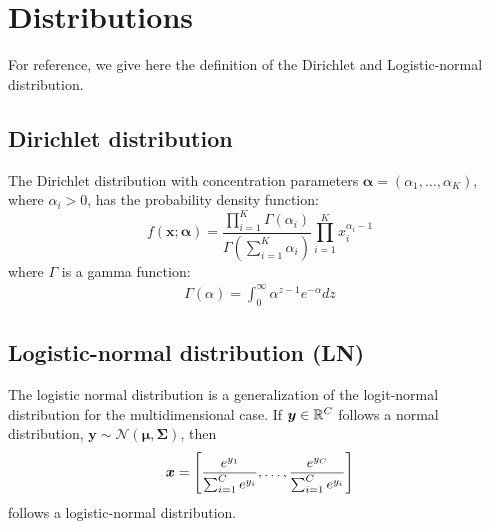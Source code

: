 \section{Distributions}\label{distributions}

For reference, we give here the definition of the Dirichlet and Logistic-normal distribution.

\subsection{Dirichlet distribution}

The Dirichlet distribution with concentration parameters $\bm \alpha = ( \alpha_1, \dots, \alpha_K )$, where $\alpha_i > 0$, has the probability density function:
\begin{equation}
    f(\bm x; \bm \alpha) =
    \frac{\prod_{i=1}^K \Gamma(\alpha_i)}{\Gamma\left( \sum_{i=1}^K \alpha_i \right)}
    \prod_{i=1}^K x_i^{\alpha_i - 1}
\end{equation}
where $\Gamma$ is a gamma function:
\begin{align*}
    \Gamma(\alpha) = \int_0^\infty \alpha^{z-1} e^{-\alpha} dz
\end{align*}

\subsection{Logistic-normal distribution (LN)}

The logistic normal distribution is a generalization of the logit-normal distribution for the multidimensional case. If $\bm y \in \mathbb{R}^{C}$ follows a normal distribution, $\bm y \sim \mathcal{N}(\bm \mu, \bm \Sigma)$, then
\begin{align*}
    \bm x = \left[
        \frac{e^{y_1}}{\sum_{i=1}^{C} e^{y_i}},
        \dots,
        \frac{e^{y_{C}}}{\sum_{i=1}^{C} e^{y_i}}
    \right]
\end{align*}
follows a logistic-normal distribution.
